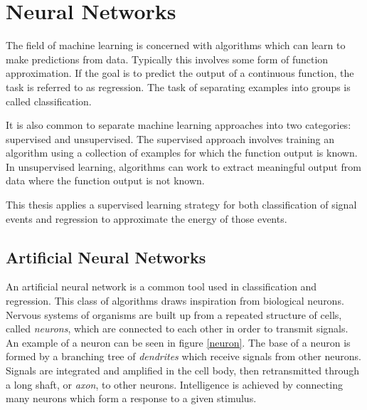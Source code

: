 \chapter{Neural Networks}
\label{nnet_chapter}

The field of machine learning is concerned with algorithms which can learn to make predictions from data.  Typically this involves some form of function approximation.  If the goal is to predict the output of a continuous function, the task is referred to as regression.  The task of separating examples into groups is called classification.

It is also common to separate machine learning approaches into two categories: supervised and unsupervised.  The supervised approach involves training an algorithm using a collection of examples for which the function output is known.  In unsupervised learning, algorithms can work to extract meaningful output from data where the function output is not known.

This thesis applies a supervised learning strategy for both classification of signal events and regression to approximate the energy of those events.

\section{Artificial Neural Networks}

An artificial neural network is a common tool used in classification and regression.  This class of algorithms draws inspiration from biological neurons.  Nervous systems of organisms are built up from a repeated structure of cells, called \textit{neurons}, which are connected to each other in order to transmit signals.  An example of a neuron can be seen in figure \ref{neuron}.  The base of a neuron is formed by a branching tree of \textit{dendrites} which receive signals from other neurons.  Signals are integrated and amplified in the cell body, then retransmitted through a long shaft, or \textit{axon}, to other neurons.  Intelligence is achieved by connecting many neurons which form a response to a given stimulus.

